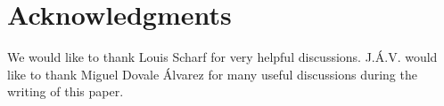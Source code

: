 \documentclass[letterpaper, reqno, 11pt]{amsart}
\theoremstyle{definition}
\theoremstyle{remark}
\numberwithin{equation}{section}
\begin{document}
\section*{Acknowledgments}
We would like to thank Louis Scharf for very helpful discussions. J.\'A.V. would like to thank Miguel Dovale \'Alvarez for many useful discussions during the writing of this paper.



\end{document}
